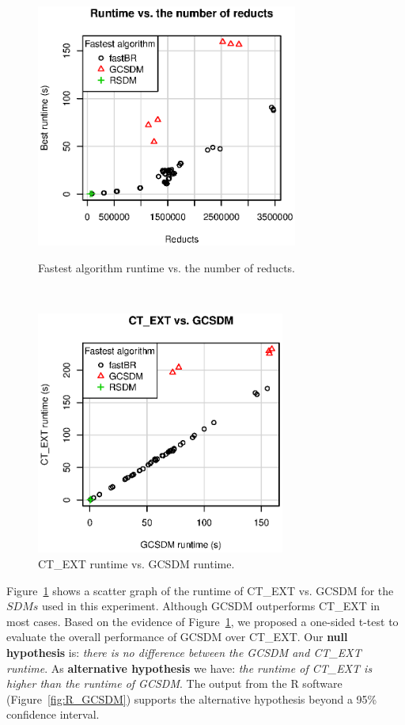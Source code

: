 \documentclass[authoryear,11pt]{elsarticle}
\begin{document}
	\begin{figure}[htb]
	\begin{minipage}{.48\textwidth}
	    \begin{center}
	       \includegraphics[height=8cm]{runtimeReducts.eps}
	    \end{center}
	\caption{Fastest algorithm runtime vs. the number of reducts.}
	\label{fig:TimeReducts}
	\end{minipage}%
	~
	\begin{minipage}{.48\textwidth}
	    \begin{center}
	       \includegraphics[height=8cm]{scatter_CTvsGAP.eps}
	    \end{center}
	\caption{CT\_EXT runtime vs. GCSDM runtime.}
	\label{fig:CTvsGAP}
	\end{minipage}	
	\end{figure}		
	
	Figure~\ref{fig:CTvsGAP} shows a scatter graph of the runtime of CT\_EXT vs. GCSDM for the $SDMs$ used in
	this experiment. Although GCSDM outperforms CT\_EXT in most cases. Based on the evidence of
	Figure~\ref{fig:CTvsGAP}, we proposed a one-sided t-test to evaluate the overall performance of GCSDM over
	CT\_EXT. Our \textbf{null hypothesis} is: \emph{there is no difference between the GCSDM and CT\_EXT runtime}.
	As \textbf{alternative hypothesis} we have: \emph{the runtime of CT\_EXT is higher than the runtime of GCSDM}.
	The output from the R software (Figure~\ref{fig:R_GCSDM}) supports the alternative hypothesis beyond a 95\%
	confidence interval. 
	
\end{document}

